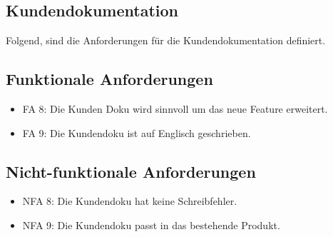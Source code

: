 \subsection{Kundendokumentation}

Folgend, sind die Anforderungen für die Kundendokumentation definiert.

\subsection*{Funktionale Anforderungen}
\begin{itemize}
	\item FA 8: Die Kunden Doku wird sinnvoll um das neue Feature erweitert.
	\item FA 9: Die Kundendoku ist auf Englisch geschrieben.
\end{itemize}

\subsection*{Nicht-funktionale Anforderungen}
\begin{itemize}
	\item NFA 8: Die Kundendoku hat keine Schreibfehler. 
	\item NFA 9: Die Kundendoku passt in das bestehende Produkt.
\end{itemize}